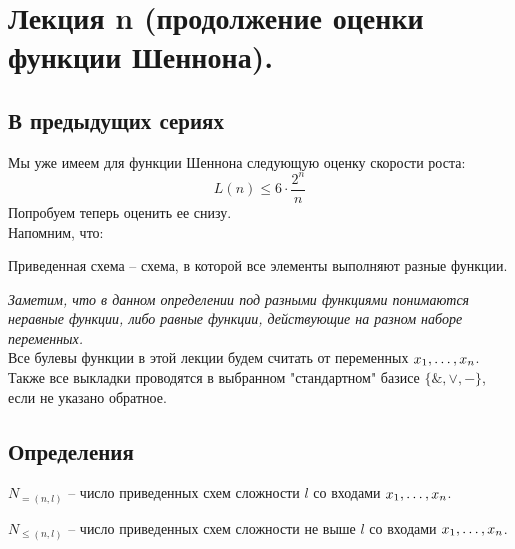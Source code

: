 \section{Лекция n (продолжение оценки функции Шеннона).} 
\subsection{В предыдущих сериях}
Мы уже имеем для функции Шеннона следующую оценку скорости роста:
$$ L(n)\leq 6\cdot \frac{2^n}{n}$$
Попробуем теперь оценить ее снизу.\\
Напомним, что:
\begin{definition}
Приведенная схема -- схема, в которой все элементы выполняют разные функции.
\end{definition}
\textit{Заметим, что в данном определении под разными функциями понимаются неравные функции, либо равные функции, действующие на разном наборе переменных.}\\
Все булевы функции в этой лекции будем считать от переменных $x_1, \ldots, x_n$. Также все выкладки проводятся в выбранном "стандартном" базисе $\{\& ,\vee ,-\}$, если не указано обратное.
\subsection{Определения}
\begin{definition}
$N_{=(n,l)}$ -- число приведенных схем сложности $l$ со входами $x_1, \ldots, x_n$.
\end{definition}
\begin{definition}
$N_{\leq(n,l)}$ -- число приведенных схем сложности не выше $l$ со входами $x_1, \ldots, x_n$.
\end{definition}
